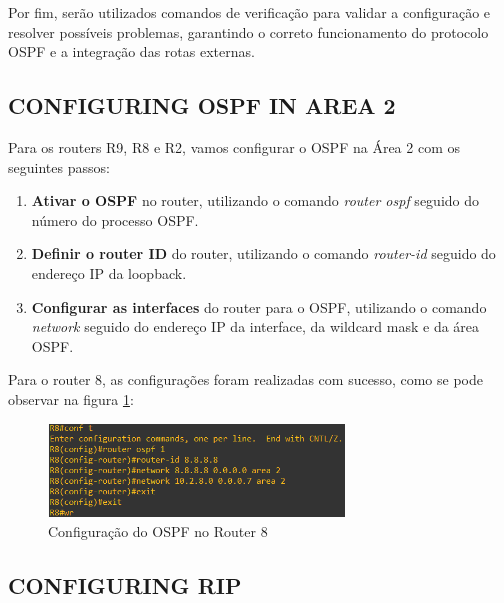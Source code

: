\documentclass[11pt,english, openright, oneside]{book}
\begin{document}
Por fim, serão utilizados comandos de verificação para validar a configuração e resolver possíveis problemas, garantindo o correto funcionamento do protocolo OSPF e a integração das rotas externas.
\vspace{0.2cm}

\subsection{CONFIGURING OSPF IN AREA 2}
\vspace{0.2cm}

Para os routers R9, R8 e R2, vamos configurar o OSPF na Área 2 com os seguintes passos:
\vspace{0.2cm}

\begin{enumerate}
  \item \textbf{Ativar o OSPF} no router, utilizando o comando \textit{router ospf} seguido do número do processo OSPF.
  \item \textbf{Definir o router ID} do router, utilizando o comando \textit{router-id} seguido do endereço IP da loopback.
  \item \textbf{Configurar as interfaces} do router para o OSPF, utilizando o comando \textit{network} seguido do endereço IP da interface, da wildcard mask e da área OSPF.
\end{enumerate}
\vspace{0.2cm}

Para o router 8, as configurações foram realizadas com sucesso, como se pode observar na figura \ref{fig:config30}:
\vspace{0.2cm}

\begin{figure}[H]
  \centering
  \includegraphics[width=0.70\textwidth]{imagens/Tarefa4/17.config_R8.png}
  \caption{Configuração do OSPF no Router 8}
  \label{fig:config30}
\end{figure}
\vspace{0.2cm}

\subsection{CONFIGURING RIP}
\vspace{0.2cm}
\end{document}
